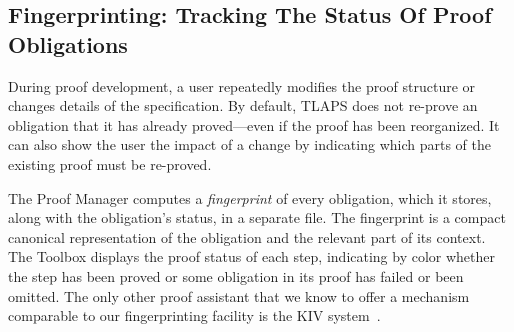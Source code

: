 \documentclass[a4paper,draft]{llncs}
\newcommand{\tlaplus}{\mbox{TLA\kern -.35ex$^+$}\xspace}
\begin{document}
\subsection{Fingerprinting: Tracking The Status Of Proof Obligations}
\label{sec:fingerprinting}

During proof development, a user repeatedly modifies the proof
structure or changes details of the specification.  By default, TLAPS
does not re-prove an obligation that it has already proved---even if
the proof has been reorganized.  It can also show the user the impact
of a change by indicating which parts of the existing proof must be
re-proved.

The Proof Manager computes a \emph{fingerprint} of every obligation, 
which it
stores, along with the obligation's status, in a separate file.
The fingerprint is a compact canonical representation of the 
obligation and the relevant part of its context.
%
The Toolbox displays the proof status of each step, indicating by
color whether the step has been proved or some obligation in its proof
has failed or been omitted.
The only other proof
assistant that we know to offer a mechanism comparable to our fingerprinting
facility is the KIV system~\cite{balser:kiv}.

\end{document}
